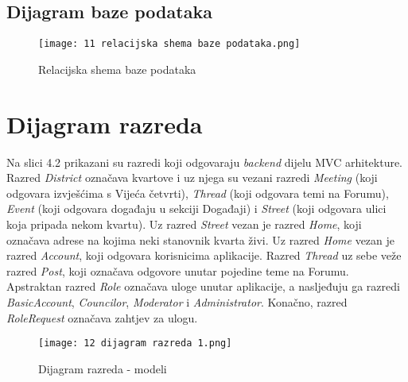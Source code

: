 							
							
			\eject	
			
			\subsection{Dijagram baze podataka}
	\begin{figure}[h]
	\centering
  \hbox{\hspace{-2.2cm}\texttt{[image: 11 relacijska shema baze podataka.png]}}
  \caption{Relacijska shema baze podataka}
  \label{Relacijska_shema}
\end{figure}
			
			\eject
			
		\section{Dijagram razreda}
		
			
			Na slici 4.2 prikazani su razredi koji odgovaraju \textit{backend} dijelu MVC arhitekture. Razred \textit{District} označava kvartove i uz njega su vezani razredi \textit{Meeting} (koji odgovara izvješćima s Vijeća četvrti), \textit{Thread} (koji odgovara temi na Forumu), \textit{Event} (koji odgovara događaju u sekciji Događaji) i \textit{Street} (koji odgovara ulici koja pripada nekom kvartu). Uz razred \textit{Street} vezan je razred \textit{Home}, koji označava adrese na kojima neki stanovnik kvarta živi. Uz razred \textit{Home} vezan je razred \textit{Account}, koji odgovara korisnicima aplikacije. Razred \textit{Thread} uz sebe veže razred \textit{Post}, koji označava odgovore unutar pojedine teme na Forumu. Apstraktan razred \textit{Role} označava uloge unutar aplikacije, a nasljeđuju ga razredi \textit{BasicAccount}, \textit{Councilor}, \textit{Moderator} i \textit{Administrator}. Konačno, razred \textit{RoleRequest} označava zahtjev za ulogu.
			
			\begin{figure}[H]
		\centering
		\texttt{[image: 12 dijagram razreda 1.png]}
		\caption{Dijagram razreda - modeli}
		\end{figure}
			
			
			
			\eject
			
		
			
